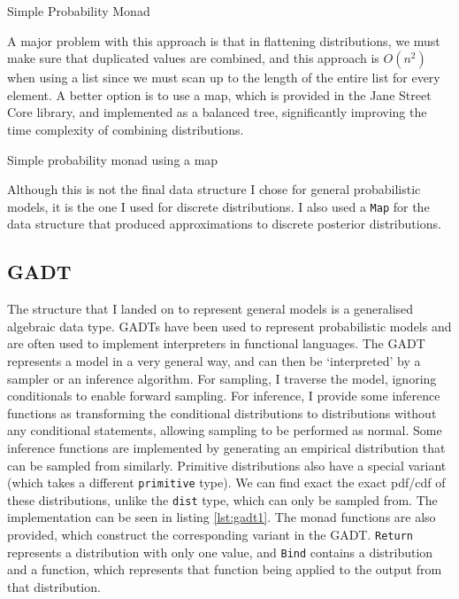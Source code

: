 \begin{listing}[!ht]
	\caption{Simple Probability Monad}
	\label{lst:monad_plist}
\end{listing}

A major problem with this approach is that in flattening distributions, we must make sure that duplicated values are combined, and this approach is $O(n^2)$ when using a list since we must scan up to the length of the entire list for every element. A better option is to use a map, which is provided in the Jane Street Core library, and implemented as a balanced tree, significantly improving the time complexity of combining distributions.

\begin{listing}[!ht]
	\caption{Simple probability monad using a map}
	\label{lst:monad_pmap}
\end{listing}

Although this is not the final data structure I chose for general probabilistic models, it is the one I used for discrete distributions. I also used a \texttt{Map} for the data structure that produced approximations to discrete posterior distributions.

\subsection{GADT} \label{sec:gadt}

The structure that I landed on to represent general models is a generalised algebraic data type. GADTs have been used to represent probabilistic models \cite{scibior2015practical} and are often used to implement interpreters in functional languages. The GADT represents a model in a very general way, and can then be `interpreted' by a sampler or an inference algorithm. For sampling, I traverse the model, ignoring conditionals to enable forward sampling. For inference, I provide some inference functions as transforming the conditional distributions to distributions without any conditional statements, allowing sampling to be performed as normal. Some inference functions are implemented by generating an empirical distribution that can be sampled from similarly. Primitive distributions also have a special variant (which takes a different \texttt{primitive} type). We can find exact the exact pdf/cdf of these distributions, unlike the \texttt{dist} type, which can only be sampled from. The implementation can be seen in listing \ref{lst:gadt1}. The monad functions are also provided, which construct the corresponding variant in the GADT. \texttt{Return} represents a distribution with only one value, and \texttt{Bind} contains a distribution and a function, which represents that function being applied to the output from that distribution.

